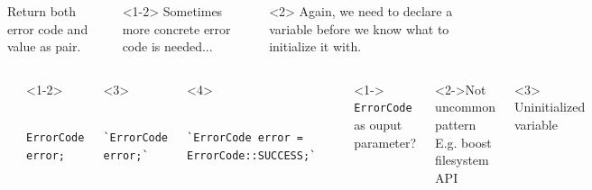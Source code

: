 \documentclass{beamer}
\begin{document}
\begin{frame}[fragile,t]
\begin{columns}[T]
\begin{onlyenv}
        \begin{block}{}
            Return both error code and value as pair.
        \end{block}

		\end{onlyenv}
	
	
	\begin{block}<1-2>{}
		Sometimes more concrete error code is needed...
	\end{block}
	\begin{block}{}
		Again, we need to declare a variable before we know what to initialize it with.
	\end{block}

	\end{columns}
\end{frame}

\begin{frame}[fragile,t]
	\begin{columns}[T]
		\begin{lstlisting}
			std::unique_ptr<A> createA(`ErrorCode&` error)
			{
				if (success)
				{
					error = ErrorCode::SUCCESS;
					return std::make_unique<A>();
				}
				else if (resource_busy)
				{
					error = ErrorCode::RESOURCE_BUSY;
					return nullptr;
				}
				else if(resource_no_exist)
				{
					error = ErrorCode::NO_RESOURCE;
					return nullptr;
				}
			}
		\end{lstlisting}
        \hrulefill
		\begin{onlyenv}
		\begin{lstlisting}
			ErrorCode error;		
		\end{lstlisting}
		\end{onlyenv}
		\begin{onlyenv}<3>
		\begin{lstlisting}
			`ErrorCode error;`		
		\end{lstlisting}
		\end{onlyenv}
		\begin{onlyenv}<4>
		\begin{lstlisting}
			`ErrorCode error = ErrorCode::SUCCESS;`		
		\end{lstlisting}
		\end{onlyenv}
		\begin{lstlisting}
			auto p = createA(error);
			if (error == ErrorCode::SUCCESS)
			{
			}
		\end{lstlisting}

	\begin{block}<1->{}
		\texttt{ErrorCode} as ouput parameter?
	\end{block}
	\begin{block}<2->{Not uncommon pattern}
		E.g. boost filesystem API
	\end{block}
	\begin{block}{}
		Uninitialized variable
	\end{block}	
	
	\end{columns}
\end{frame}
\end{document}
